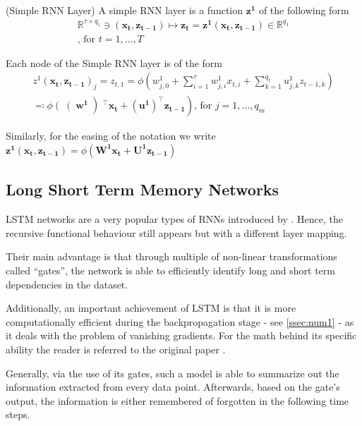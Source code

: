 \documentclass[a4paper, oneside]{discothesis}
\begin{document}
(Simple RNN Layer) A simple RNN layer is a function $\bm{z^1}$ of the following form
\begin{equation}
\begin{split}
\mathbb{R}^{\tau\times q_1} \ni (\bm{x_t}, \bm{z_{t-1}}) \longmapsto \bm{z_t} = \bm{z^1}(\bm{x_t}, \bm{z_{t-1}}) \in \mathbb{R}^{q_1} \\ \text{, for } t = 1, \dots, T
\end{split}
\end{equation}

Each node of the Simple RNN layer is of the form 
\begin{equation}
\begin{split}
z^1(\bm{x_t}, \bm{z_{t-1}})_j = z_{t,1} = \phi \left(w_{j,0}^1+\sum_{i=1}^{\tau}w_{j,i}^1x_{t,i}+\sum_{k = 1}^{q_1}u_{j,k}^1 z_{t-1, k}\right)\\\eqqcolon\phi\left(\right(\bm{w^1}\left) ^\intercal\bm{x_t}+\left(\bm{u^1}\right)^\intercal \bm{z_{t-1}}\right) \text{, for } j = 1, \dots, q_m
\end{split}
\end{equation}

Similarly, for the easing of the notation we write $\bm{z^1}(\bm{x_t}, \bm{z_{t-1}}) = \phi\left( \bm{W^1}\bm{x_t} + \bm{U^1}\bm{z_{t-1}}\right)$

\subsection{Long Short Term Memory Networks}\label{lstm}
LSTM networks are a very popular types of RNNs introduced by \cite{LSTM}. Hence, the recursive functional behaviour still appears but with a different layer mapping.

Their main advantage is that through multiple of non-linear transformations called ``gates'', the network is able to efficiently identify long and short term dependencies in the dataset.

Additionally, an important achievement of LSTM is that it is  more computationally efficient during the backpropagation stage - see \ref{ssec:num1} - as it deals with the problem of vanishing gradients. For the math behind its specific ability the reader is referred to the original paper \cite{LSTM}. 

Generally, via the use of its gates, such a model is able to summarize out the information extracted from every data point. Afterwards, based on the gate's output, the information is either remembered of forgotten in the following time steps.
\end{document}
